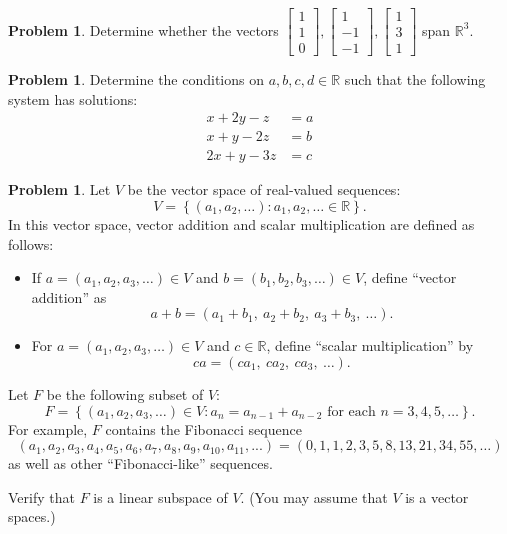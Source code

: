 \documentclass[10pt]{article}
\theoremstyle{definition}
\newtheorem{problem}[theorem]{Problem}
\newcommand{\1}[1]{\textbf{1}_{\left[#1\right]}} %
\def\R{\mathbb{R}} %
\begin{document}
\begin{problem}
  Determine whether the vectors
  $\begin{bmatrix}
    1\\1\\0
  \end{bmatrix},
  \begin{bmatrix}
    1\\-1\\-1
  \end{bmatrix},
  \begin{bmatrix}
    1\\3\\1
  \end{bmatrix} $
  span $\R^{3}$.
\end{problem}

\begin{problem}
  Determine the conditions on $a,b,c,d\in \R$ such that the following system
  has solutions:
  \begin{align*}
    x+2y-z&=a\\
    x+y-2z&=b\\
    2x+y-3z&=c
  \end{align*}
\end{problem}


\begin{problem}
  Let $V$ be the vector space of real-valued sequences:
  \begin{equation*}
    V = \left\{(a_{1},a_{2},\ldots) : a_{1},a_{2},\ldots\in \R\right\}.
  \end{equation*}
  In this vector space, vector addition and scalar multiplication are defined
  as follows:
  \begin{itemize}
    \item If $a=(a_{1},a_{2},a_{3},\ldots)\in V$ and
    $b=(b_{1},b_{2},b_{3},\ldots)\in V$, define ``vector addition'' as
    \begin{equation*}
      a+b = (a_{1}+b_{1},\ a_{2}+b_{2},\ a_{3}+b_{3},\ \ldots).
    \end{equation*}
    \item  For $a=(a_{1},a_{2},a_{3},\ldots)\in V$ and $c\in \R$, define ``scalar multiplication'' by
    \begin{equation*}
      ca = (ca_{1},\ ca_{2},\ ca_{3},\ \ldots).
    \end{equation*}
  \end{itemize}
  Let $F$ be the following subset of $V$:
  \begin{equation*}
    F = \left\{(a_{1},a_{2},a_{3},\ldots)\in V: a_{n}=a_{n-1}+a_{n-2} \text{ for
        each }n=3,4,5,\ldots\right\}.
  \end{equation*}
  For example, $F$ contains the Fibonacci sequence
  \begin{equation*}
    (a_{1},a_{2},a_{3},a_{4},a_{5},a_{6},a_{7},a_{8},a_{9},a_{10},a_{11},...)= (0, 1, 1, 2, 3, 5, 8, 13, 21, 34, 55,\ldots)
  \end{equation*}
  as well as other ``Fibonacci-like'' sequences.
  
  Verify that $F$ is a linear subspace of $V$. (You may assume that $V$ is a
  vector spaces.)
\end{problem}
\end{document}
